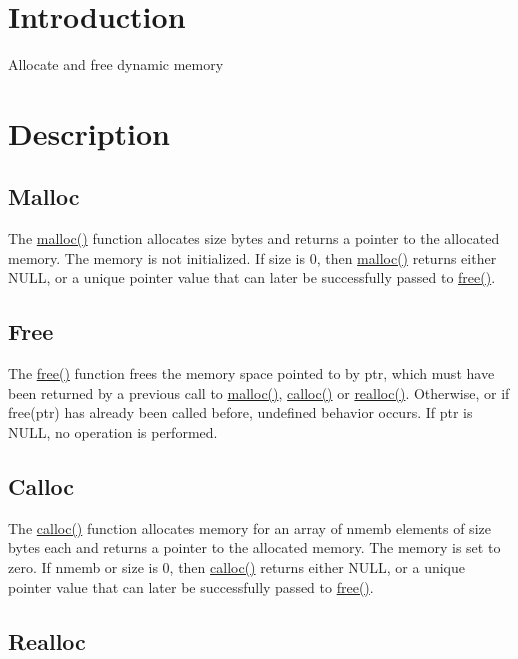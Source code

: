\hypertarget{index_intro_sec}{}\section{Introduction}\label{index_intro_sec}
Allocate and free dynamic memory\hypertarget{index_descr_sec}{}\section{Description}\label{index_descr_sec}
\hypertarget{index_malloc}{}\subsection{Malloc}\label{index_malloc}
The \hyperlink{malloc_8c_a7ac38fce3243a7dcf448301ee9ffd392}{malloc()} function allocates size bytes and returns a pointer to the allocated memory. The memory is not initialized. If size is 0, then \hyperlink{malloc_8c_a7ac38fce3243a7dcf448301ee9ffd392}{malloc()} returns either N\+U\+LL, or a unique pointer value that can later be successfully passed to \hyperlink{free_8c_ac27a03e54e8a0e720ad2cfb00cdc7511}{free()}.\hypertarget{index_free}{}\subsection{Free}\label{index_free}
The \hyperlink{free_8c_ac27a03e54e8a0e720ad2cfb00cdc7511}{free()} function frees the memory space pointed to by ptr, which must have been returned by a previous call to \hyperlink{malloc_8c_a7ac38fce3243a7dcf448301ee9ffd392}{malloc()}, \hyperlink{calloc_8c_a62b7798461bd461da64c5f9d35feddf7}{calloc()} or \hyperlink{realloc_8c_a1a6b5e8d2f1c37e5b43e4345586075be}{realloc()}. Otherwise, or if free(ptr) has already been called before, undefined behavior occurs. If ptr is N\+U\+LL, no operation is performed.\hypertarget{index_calloc}{}\subsection{Calloc}\label{index_calloc}
The \hyperlink{calloc_8c_a62b7798461bd461da64c5f9d35feddf7}{calloc()} function allocates memory for an array of nmemb elements of size bytes each and returns a pointer to the allocated memory. The memory is set to zero. If nmemb or size is 0, then \hyperlink{calloc_8c_a62b7798461bd461da64c5f9d35feddf7}{calloc()} returns either N\+U\+LL, or a unique pointer value that can later be successfully passed to \hyperlink{free_8c_ac27a03e54e8a0e720ad2cfb00cdc7511}{free()}.\hypertarget{index_realloc}{}\subsection{Realloc}\label{index_realloc}
